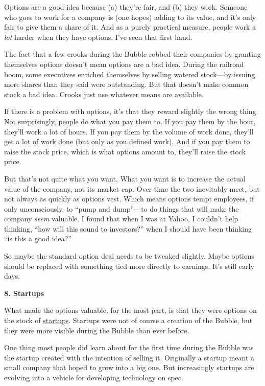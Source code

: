 \documentclass[12pt]{book}
\begin{document}
Options are a good idea because (a) they're fair, and (b) they work.
Someone who goes to work for a company is (one hopes) adding to its
value, and it's only fair to give them a share of it. And as a purely
practical measure, people work a \emph{lot} harder when they have
options. I've seen that first hand.

The fact that a few crooks during the Bubble robbed their companies by
granting themselves options doesn't mean options are a bad idea. During
the railroad boom, some executives enriched themselves by selling
watered stock---by issuing more shares than they said were outstanding.
But that doesn't make common stock a bad idea. Crooks just use whatever
means are available.

If there is a problem with options, it's that they reward slightly the
wrong thing. Not surprisingly, people do what you pay them to. If you
pay them by the hour, they'll work a lot of hours. If you pay them by
the volume of work done, they'll get a lot of work done (but only as you
defined work). And if you pay them to raise the stock price, which is
what options amount to, they'll raise the stock price.

But that's not quite what you want. What you want is to increase the
actual value of the company, not its market cap. Over time the two
inevitably meet, but not always as quickly as options vest. Which means
options tempt employees, if only unconsciously, to ``pump and
dump''---to do things that will make the company \emph{seem} valuable. I
found that when I was at Yahoo, I couldn't help thinking, ``how will
this sound to investors?'' when I should have been thinking ``is this a
good idea?''

So maybe the standard option deal needs to be tweaked slightly. Maybe
options should be replaced with something tied more directly to
earnings. It's still early days.

\textbf{8. Startups}

What made the options valuable, for the most part, is that they were
options on the stock of \href{start.html}{startups}. Startups were not
of course a creation of the Bubble, but they were more visible during
the Bubble than ever before.

One thing most people did learn about for the first time during the
Bubble was the startup created with the intention of selling it.
Originally a startup meant a small company that hoped to grow into a big
one. But increasingly startups are evolving into a vehicle for
developing technology on spec.
\end{document}
